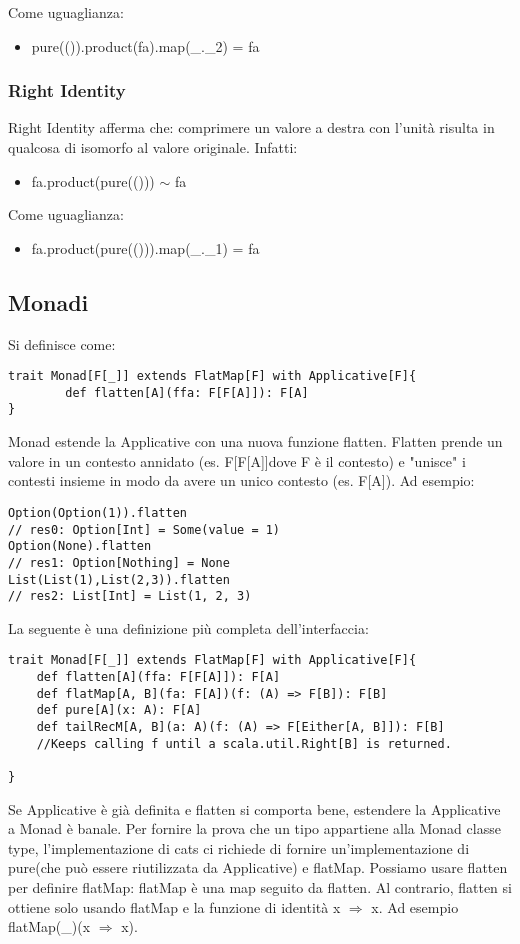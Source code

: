 \noindent Come uguaglianza:
\begin{itemize}
    \item pure(()).product(fa).map(\_.\_2) = fa
\end{itemize}

\subsubsection{Right Identity}
Right Identity afferma che: comprimere un valore a destra con l'unità risulta in qualcosa di isomorfo al valore originale.
Infatti:
\begin{itemize}
    \item fa.product(pure(())) $\sim$ fa
\end{itemize}
Come uguaglianza:
\begin{itemize}
    \item fa.product(pure(())).map(\_.\_1) = fa
\end{itemize}




\subsection{Monadi}
Si definisce come:
\begin{verbatim}
trait Monad[F[_]] extends FlatMap[F] with Applicative[F]{
        def flatten[A](ffa: F[F[A]]): F[A]
}
\end{verbatim}
\noindent Monad estende la Applicative con una nuova funzione flatten. Flatten prende un valore in un contesto annidato (es. F[F[A]]dove F è il contesto) e "unisce" i contesti insieme in modo da avere un unico contesto (es. F[A]).
Ad esempio:
\begin{verbatim}
Option(Option(1)).flatten
// res0: Option[Int] = Some(value = 1)
Option(None).flatten
// res1: Option[Nothing] = None
List(List(1),List(2,3)).flatten
// res2: List[Int] = List(1, 2, 3)    
\end{verbatim}
La seguente è una definizione più completa dell'interfaccia:
\begin{verbatim}
trait Monad[F[_]] extends FlatMap[F] with Applicative[F]{
    def flatten[A](ffa: F[F[A]]): F[A]
    def flatMap[A, B](fa: F[A])(f: (A) => F[B]): F[B]
    def pure[A](x: A): F[A]
    def tailRecM[A, B](a: A)(f: (A) => F[Either[A, B]]): F[B] 
    //Keeps calling f until a scala.util.Right[B] is returned.

}
\end{verbatim}
\noindent Se Applicative è già definita e flatten si comporta bene, estendere la Applicative a Monad è banale. Per fornire la prova che un tipo appartiene alla Monad classe type, l'implementazione di cats ci richiede di fornire un'implementazione di pure(che può essere riutilizzata da Applicative) e flatMap. Possiamo usare flatten per definire flatMap: flatMap è una map seguito da flatten. Al contrario, flatten si ottiene solo usando flatMap e la funzione di identità x $\Rightarrow$ x. Ad esempio flatMap(\_)(x $\Rightarrow$ x).

